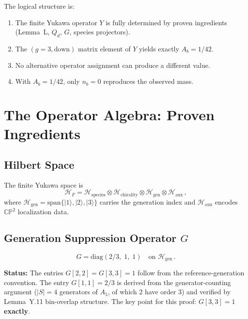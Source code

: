 \documentclass[11pt,a4paper]{article}
\newcommand{\CP}{\mathbb{CP}}
\theoremstyle{definition}
\theoremstyle{remark}
\begin{document}
The logical structure is:
\begin{enumerate}
\item The finite Yukawa operator $Y$ is fully determined by proven ingredients
      (Lemma~L, $Q_d$, $G$, species projectors).
\item The $(g=3, \text{down})$ matrix element of $Y$ yields exactly
      $A_b = 1/42$.
\item No alternative operator assignment can produce a different value.
\item With $A_b = 1/42$, only $n_b = 0$ reproduces the observed mass.
\end{enumerate}

\section{The Operator Algebra: Proven Ingredients}
\label{sec:operators}

\subsection{Hilbert Space}

The finite Yukawa space is
\begin{equation}
\mathcal{H}_F = \mathcal{H}_{\text{species}} \otimes
                \mathcal{H}_{\text{chirality}} \otimes
                \mathcal{H}_{\text{gen}} \otimes
                \mathcal{H}_{\text{aux}}\,,
\end{equation}
where $\mathcal{H}_{\text{gen}} = \text{span}\{|1\rangle, |2\rangle, |3\rangle\}$
carries the generation index and $\mathcal{H}_{\text{aux}}$ encodes
$\CP^2$ localization data.

\subsection{Generation Suppression Operator $G$}

\begin{equation}
\boxed{G = \text{diag}(2/3,\; 1,\; 1)}
\quad \text{on } \mathcal{H}_{\text{gen}}\,.
\end{equation}

\noindent
\textbf{Status:} The entries $G[2,2] = G[3,3] = 1$ follow from the
reference-generation convention.  The entry $G[1,1] = 2/3$ is derived from
the generator-counting argument ($|S| = 4$ generators of $A_5$, of which 2
have order 3) and verified by Lemma~Y.11 bin-overlap structure.  The key
point for this proof: $G[3,3] = 1$ \textbf{exactly}.
\end{document}
